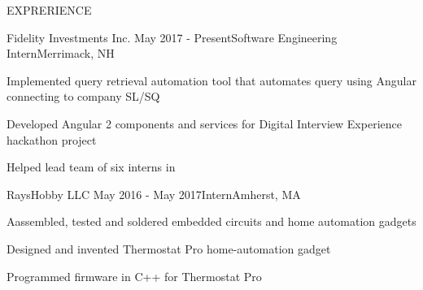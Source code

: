 \documentclass{resume} %
\begin{document}
	\begin{rSection}{EXPRERIENCE}
			
		\begin{rSubsection}{Fidelity Investments Inc.} {May 2017 - Present}{Software Engineering Intern}{Merrimack, NH}
			\item Implemented query retrieval automation tool that automates query using Angular connecting to company SL/SQ
			\item Developed Angular 2 components and services for Digital Interview Experience hackathon project
			\item Helped lead team of six interns in 
		\end{rSubsection}
	
		\begin{rSubsection}{RaysHobby LLC} {May 2016 - May 2017}{Intern}{Amherst, MA}
			\item Aassembled, tested and soldered embedded circuits and home automation gadgets
			\item Designed and invented  Thermostat Pro home-automation gadget
			\item Programmed firmware in C++ for Thermostat Pro
		\end{rSubsection}
	
	\end{rSection}
	
	
\end{document}
